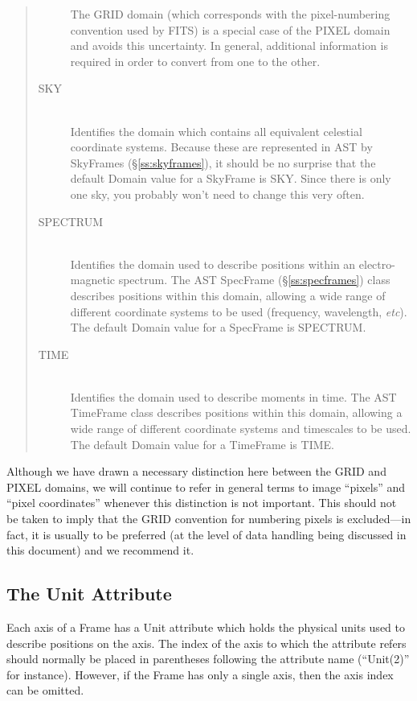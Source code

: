 \documentclass[twoside,11pt]{article}
\newcommand{\secref}[1]{\S\ref{#1}}
\newcommand{\secref}[1]{\ref{#1}}
\begin{document}
\begin{quote}
\begin{description}
The GRID domain (which corresponds with the pixel-numbering convention
used by FITS) is a special case of the PIXEL domain and avoids this
uncertainty. In general, additional information is required in order
to convert from one to the other.

\item[SKY]\mbox{}\\
Identifies the domain which contains all equivalent celestial
coordinate systems. Because these are represented in AST by SkyFrames
(\secref{ss:skyframes}), it should be no surprise that the default
Domain value for a SkyFrame is SKY. Since there is only one sky, you
probably won't need to change this very often.

\item[SPECTRUM]\mbox{}\\
Identifies the domain used to describe positions within an
electro-magnetic spectrum. The AST SpecFrame (\secref{ss:specframes})
class describes positions within this domain, allowing a wide range of
different coordinate systems to be used (frequency, wavelength,
{\em{etc}}). The default Domain value for a SpecFrame is SPECTRUM.

\item[TIME]\mbox{}\\
Identifies the domain used to describe moments in time. The AST TimeFrame
class describes positions within this domain, allowing a wide range of
different coordinate systems and timescales to be used. The default Domain
value for a TimeFrame is TIME.

\end{description}
\end{quote}

Although we have drawn a necessary distinction here between the GRID
and PIXEL domains, we will continue to refer in general terms to image
``pixels'' and ``pixel coordinates'' whenever this distinction is not
important. This should not be taken to imply that the GRID convention
for numbering pixels is excluded---in fact, it is usually to be
preferred (at the level of data handling being discussed in this
document) and we recommend it.

\subsection{\label{ss:frameunits}The Unit Attribute}
Each axis of a Frame has a Unit attribute which holds the physical units used
to describe positions on the axis. The index of the axis to which the
attribute refers should normally be placed in parentheses following the
attribute name (``Unit(2)'' for instance). However, if the Frame has only
a single axis, then the axis index can be omitted.
\end{document}
